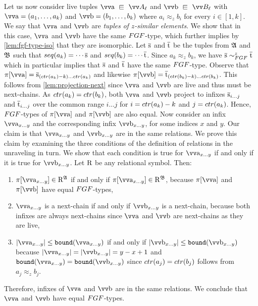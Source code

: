 Let us now consider live tuples $\elemtuptuplea \sqin \unraveldom{A}_{\ell}$ and $\elemtuptupleb \sqin \unraveldom{B}_{\ell}$ with $\elemtuptuplea = (a_{1}, \ldots, a_{k})$ and $\elemtuptupleb = (b_{1}, \ldots, b_{k})$ where $a_{i} \approx_{z} b_{i}$ for every $i \in [1,k]$.
We say that $\elemtuptuplea$ and $\elemtuptupleb$ are \emph{tuples of $z$-similar elements}.
We show that in this case, $\elemtuptuplea$ and $\elemtuptupleb$ have the same $\FGF$-type, which further implies by \cref{lem:fgf-type-iso} that they are isomorphic.
Let $\overline{\mathrm{s}}$ and $\overline{\mathrm{t}}$ be the tuples from ${\mathfrak{A}}$ and ${\mathfrak{B}}$ such that $\seq{a_{k}} = \cdots \elemtuples$ and $\seq{b_{k}} = \cdots \elemtuplet$.
Since $a_{k} \approx_z b_{k}$, we have $\elemtuples \bisimto_{\FGF}^{z} \elemtuplet$ which in particular implies that $\overline{\mathrm{s}}$ and $\overline{\mathrm{t}}$ have the same $\FGF$-type.
Observe that $\pi[\elemtuptuplea] = \elemtuples_{(\ctr{a_{k}}-k)\ldots{}\ctr{a_{k}}}$ and likewise $\pi[\elemtuptupleb] = \elemtuplet_{(\ctr{b_{k}}-k)\ldots{}\ctr{b_{k}}}$.
This follows from \cref{lem:projection-next} since $\elemtuptuplea$ and $\elemtuptupleb$ are live and thus must be next-chains.
As $\ctr{a_{k}} = \ctr{b_{k}}$, both $\elemtuptuplea$ and $\elemtuptupleb$ project to infixes $\overline{\mathrm{s}}_{i\ldots{}j}$ and $\overline{\mathrm{t}}_{i\ldots{}j}$ over the common range $i\ldots{}j$ for $i = \ctr{a_{k}} - k$ and $j = \ctr{a_{k}}$.
Hence, $\FGF$-types of $\pi[\elemtuptuplea]$ and $\pi[\elemtuptupleb]$ are also equal.
Now consider an infix $\elemtuptuplea_{x\ldots{}y}$ and the corresponding infix $\elemtuptupleb_{x\ldots{}y}$, for some indices $x$ and $y$.
Our claim is that $\elemtuptuplea_{x\ldots{}y}$ and $\elemtuptupleb_{x\ldots{}y}$ are in the same relations.
We prove this claim by examining the three conditions of the definition of relations in the unraveling in turn.
We show that each condition is true for $\elemtuptuplea_{x\ldots{}y}$ if and only if it is true for $\elemtuptupleb_{x\ldots{}y}$.
Let $\mathrm{R}$ be any relational symbol. Then:
\begin{enumerate}
  \item $\pi[\elemtuptuplea_{x\ldots{}y}] \in \relR^{\str{A}}$ if and only if $\pi[\elemtuptuplea_{x\ldots{}y}] \in \relR^{\str{B}}$, because $\pi[\elemtuptuplea]$ and $\pi[\elemtuptupleb]$ have equal $\FGF$-types,
  \item $\elemtuptuplea_{x\ldots{}y}$ is a next-chain if and only if $\elemtuptupleb_{x\ldots{}y}$ is a next-chain, because both infixes are always next-chains since $\elemtuptuplea$ and $\elemtuptupleb$ are next-chains as they are live,
  \item $|\elemtuptuplea_{x\ldots{}y}| \le \mathtt{bound}(\elemtuptuplea_{x\ldots{}y})$ if and only if $|\elemtuptupleb_{x\ldots{}y}| \le \mathtt{bound}(\elemtuptupleb_{x\ldots{}y})$ because $|\elemtuptuplea_{x\ldots{}y}| = |\elemtuptupleb_{x\ldots{}y}| = y-x+1$ and $\mathtt{bound}(\elemtuptuplea_{x\ldots{}y}) = \mathtt{bound}(\elemtuptupleb_{x\ldots{}y})$ since $\ctr{a_{j}} = \ctr{b_{j}}$ follows from $a_{j} \approx_{z} b_{j}$.
\end{enumerate}
Therefore, infixes of $\elemtuptuplea$ and $\elemtuptupleb$ are in the same relations.
We conclude that $\elemtuptuplea$ and $\elemtuptupleb$ have equal $\FGF$-types.

